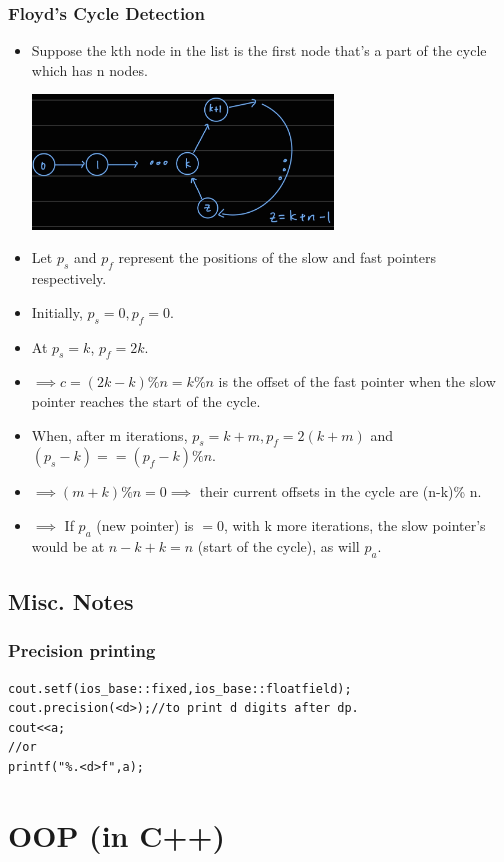 \documentclass{report}
\begin{document}
\subsection{Floyd's Cycle Detection}
\begin{itemize}
\item Suppose the kth node in the list is the first node that's a part of the cycle which has n nodes.
\begin{center}
\includegraphics[width=8cm]{rsrc/floyd.jpg}
\end{center}
\item Let $p_s$ and $p_f$ represent the positions of the slow and fast pointers respectively.
\item Initially, $p_s = 0, p_f = 0.$
\item At $p_s = k$, $p_f = 2k$.
\item $\implies c = (2k-k) \% n = k \% n$ is the offset of the fast pointer when the slow pointer reaches the start of the cycle.
\item When, after m iterations, $p_s = k+m, p_f = 2(k+m)$ and $(p_s-k) == (p_f-k) \% n$.
\item $\implies (m + k) \% n = 0 \implies $ their current offsets in the cycle are (n-k)\% n.
\item $\implies $ If $p_a$ (new pointer) is $=0$, with k more iterations, the slow pointer's would be at $n-k + k = n$ (start of the cycle), as will $p_a$.
\end{itemize}
\section*{Misc. Notes}
\subsection*{Precision printing}
\begin{lstlisting}
cout.setf(ios_base::fixed,ios_base::floatfield);
cout.precision(<d>);//to print d digits after dp.
cout<<a;
//or
printf("%.<d>f",a);
\end{lstlisting}

\chapter{OOP (in C++)}
\end{document}

